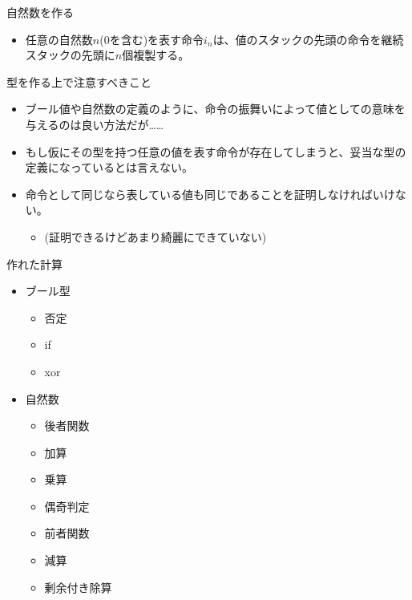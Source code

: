 \documentclass[cjk, 14pt]{beamer}
\begin{document}
\begin{frame}{自然数を作る}

  \begin{itemize}
    \item 任意の自然数$n$(0を含む)を表す命令$i_n$は、値のスタックの先頭の命令を継続スタックの先頭に$n$個複製する。
  \end{itemize}

\end{frame}

\begin{frame}{型を作る上で注意すべきこと}

  \begin{itemize}
    \item ブール値や自然数の定義のように、命令の振舞いによって値としての意味を与えるのは良い方法だが……
    \item もし仮にその型を持つ任意の値を表す命令が存在してしまうと、妥当な型の定義になっているとは言えない。
    \item 命令として同じなら表している値も同じであることを証明しなければいけない。
    \begin{itemize}
      \item (証明できるけどあまり綺麗にできていない)
    \end{itemize}
  \end{itemize}

\end{frame}

\begin{frame}{作れた計算}

  \begin{itemize}
    \item ブール型
    \begin{itemize}
      \item 否定
      \item if
      \item xor
    \end{itemize}
    \item 自然数
    \begin{itemize}
      \item 後者関数
      \item 加算
      \item 乗算
      \item 偶奇判定
      \item 前者関数
      \item 減算
      \item 剰余付き除算
    \end{itemize}
  \end{itemize}

\end{frame}
\end{document}
